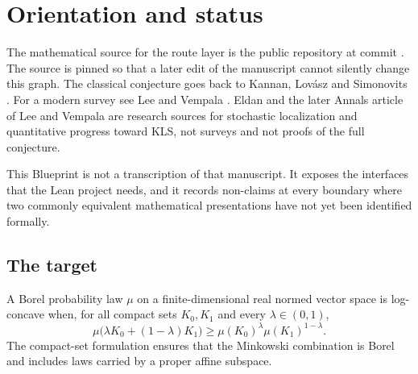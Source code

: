 \chapter{Orientation and status}
\label{chap:orientation}

The mathematical source for the route layer is the public repository
\sourcerepository{} at commit \sourcecommit.  The source is pinned so that a later edit of
the manuscript cannot silently change this graph.  The classical conjecture goes back to
Kannan, Lov\'asz and Simonovits \cite{KannanLovaszSimonovits1995}.  For a modern survey see
Lee and Vempala \cite{LeeVempala2018}.  Eldan \cite{Eldan2013ThinShell} and the later Annals
article of Lee and Vempala \cite{LeeVempala2024} are research sources for stochastic localization
and quantitative progress toward KLS, not surveys and not proofs of the full conjecture.

This Blueprint is not a transcription of that manuscript.  It exposes the interfaces that the
Lean project needs, and it records non-claims at every boundary where two commonly equivalent
mathematical presentations have not yet been identified formally.

\section{The target}

\begin{definition}
  \label{def:log-concave-law}
  \leanok
  A Borel probability law $\mu$ on a finite-dimensional real normed vector space is log-concave
  when,
  for all compact sets $K_0,K_1$ and every $\lambda\in(0,1)$,
  \[
    \mu\bigl(\lambda K_0+(1-\lambda)K_1\bigr)
      \ge \mu(K_0)^\lambda\mu(K_1)^{1-\lambda}.
  \]
  The compact-set formulation ensures that the Minkowski combination is Borel and includes laws
  carried by a proper affine subspace.
\end{definition}


